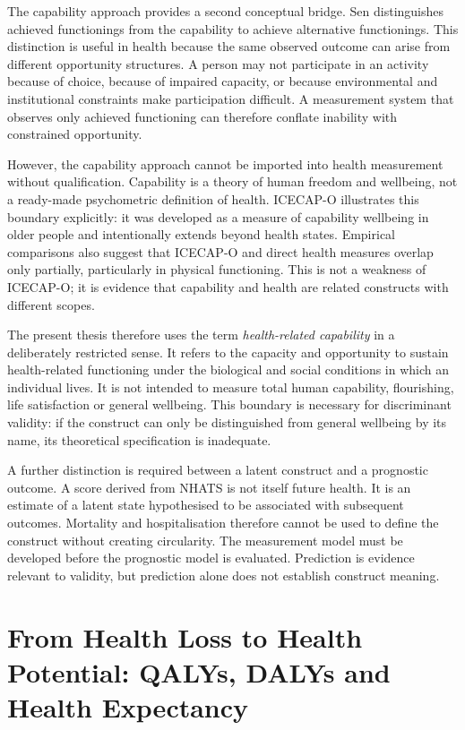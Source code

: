 The capability approach provides a second conceptual bridge. Sen distinguishes achieved functionings from the capability to achieve alternative functionings. \cite{sen_1993} This distinction is useful in health because the same observed outcome can arise from different opportunity structures. A person may not participate in an activity because of choice, because of impaired capacity, or because environmental and institutional constraints make participation difficult. A measurement system that observes only achieved functioning can therefore conflate inability with constrained opportunity.

However, the capability approach cannot be imported into health measurement without qualification. Capability is a theory of human freedom and wellbeing, not a ready-made psychometric definition of health. ICECAP-O illustrates this boundary explicitly: it was developed as a measure of capability wellbeing in older people and intentionally extends beyond health states. \cite{icecap_o,icecap_o_validation} Empirical comparisons also suggest that ICECAP-O and direct health measures overlap only partially, particularly in physical functioning. \cite{icecap_o_validation} This is not a weakness of ICECAP-O; it is evidence that capability and health are related constructs with different scopes.

The present thesis therefore uses the term \emph{health-related capability} in a deliberately restricted sense. It refers to the capacity and opportunity to sustain health-related functioning under the biological and social conditions in which an individual lives. It is not intended to measure total human capability, flourishing, life satisfaction or general wellbeing. This boundary is necessary for discriminant validity: if the construct can only be distinguished from general wellbeing by its name, its theoretical specification is inadequate.

A further distinction is required between a latent construct and a prognostic outcome. A score derived from NHATS is not itself future health. It is an estimate of a latent state hypothesised to be associated with subsequent outcomes. Mortality and hospitalisation therefore cannot be used to define the construct without creating circularity. The measurement model must be developed before the prognostic model is evaluated. Prediction is evidence relevant to validity, but prediction alone does not establish construct meaning.

\section{From Health Loss to Health Potential: QALYs, DALYs and Health Expectancy}

